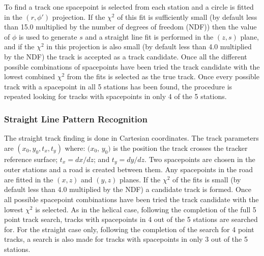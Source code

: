    To find a track one spacepoint is selected from each station and a circle is fitted in the $(r, \phi')$ projection. If the $\chi^2$ of this fit is sufficiently small (by default less than 15.0 multiplied by the number of degrees of freedom (NDF)) then the value of $\phi$ is used to generate $s$ and a straight line fit is performed in the $(z,s)$ plane, and if the $\chi^2$ in this projection is also small (by default less than 4.0 multiplied by the NDF) the track is accepted as a track candidate. Once all the different possible combinations of spacepoints have been tried the track candidate with the lowest combined $\chi^2$ from the fits is selected as the true track. Once every possible track with a spacepoint in all 5 stations has been found, the procedure is repeated looking for tracks with spacepoints in only 4 of the 5 stations. %
   

    \subsubsection{Straight Line Pattern Recognition}
    \label{subsubsec:StraightLinePatternRecognition}


    The straight track finding is done in Cartesian coordinates. The track parameters are $(x_0, y_0, t_x, t_y)$ where: $(x_0$, $y_0)$ is the position the track crosses the tracker reference surface; $t_x = dx/dz$; and $t_y = dy/dz$. Two spacepoints are chosen in the outer stations and a road is created between them. Any spacepoints in the road are fitted in the $(x,z)$ and $(y,z)$ planes. If the $\chi^2$ of the fits is small (by default less than 4.0 multiplied by the NDF) a candidate track is formed. Once all possible spacepoint combinations have been tried the track candidate with the lowest $\chi^2$ is selected. As in the helical case, following the completion of the full 5 point track search, tracks with spacepoints in 4 out of the 5 stations are searched for. For the straight case only, following the completion of the search for 4 point tracks, a search is also made for tracks with spacepoints in only 3 out of the 5 stations. 

